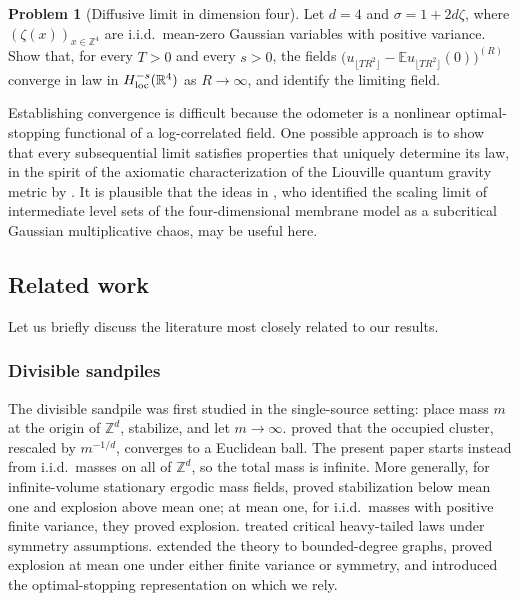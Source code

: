 \documentclass[11pt]{amsart}
\theoremstyle{plain}
\theoremstyle{definition}
\newtheorem{problem}[theorem]{Problem}
\newcommand{\Z}{\mathbb{Z}}
\newcommand{\R}{\mathbb{R}}
\newcommand{\E}{\mathbb{E}}
\begin{document}
\begin{problem}[Diffusive limit in dimension four]\label{prob:d4-diffusive}
Let $d=4$ and $\sigma=1+2d\zeta$,
where $(\zeta(x))_{x\in\Z^4}$ are i.i.d.\ mean-zero Gaussian variables with positive variance. Show that, for every $T>0$ and every $s>0$, the fields $\bigl(u_{\lfloor TR^2\rfloor}-\E u_{\lfloor TR^2\rfloor}(0)\bigr)^{(R)}$ converge in law in $H^{-s}_{\rm loc}(\R^4)$ as $R\to\infty$, and identify the limiting field.
\end{problem}



Establishing convergence is difficult because the odometer is a nonlinear
optimal-stopping functional of a log-correlated field. One possible approach
is to show that every subsequential limit satisfies properties that uniquely determine
its law, in the spirit of the axiomatic characterization of the Liouville
quantum gravity metric by \citet*{GwynneMillerLQGMetric}. It is plausible that the ideas in \citet*{LiLiuIntermediate}, who identified the scaling limit of
intermediate level sets of the four-dimensional membrane model as a subcritical Gaussian multiplicative chaos, may be useful here. 

\subsection{Related work}\label{ssec:related}

Let us briefly discuss the literature most closely related to our results.

\subsubsection{Divisible sandpiles}

The divisible sandpile was first studied in the single-source setting: place
mass $m$ at the origin of $\Z^d$, stabilize, and let $m\to\infty$.
\citet*{LevinePeres09,LevinePeres} proved that the occupied cluster, rescaled
by $m^{-1/d}$, converges to a Euclidean ball. The present paper starts instead
from i.i.d.\ masses on all of $\Z^d$, so the total mass is infinite. More
generally, for infinite-volume stationary ergodic mass fields, \citet*{LMPU}
proved stabilization below mean one and explosion above mean one; at mean
one, for i.i.d.\ masses with positive finite variance, they proved
explosion.  \citet*{CHRheavy}
treated critical heavy-tailed laws under symmetry assumptions.  \citet*{BPSH}
extended the theory to bounded-degree graphs, proved explosion at mean one
under either finite variance or symmetry, and introduced the optimal-stopping
representation on which we rely.
\end{document}

